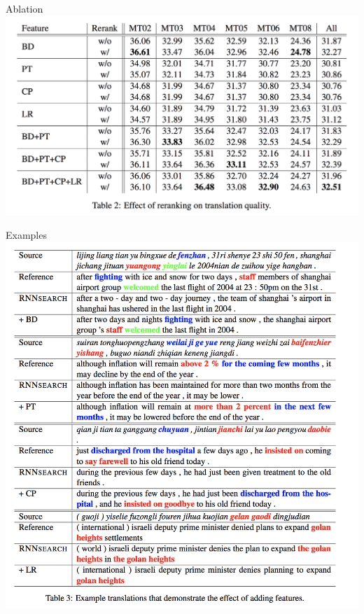 \documentclass{beamer}
\begin{document}
\begin{frame}{Ablation}{}
\centering
\includegraphics[width=\textheight]{ablation}
\end{frame}

\begin{frame}{Examples}{}
\centering
\includegraphics[height=0.8\textheight]{examples}
\end{frame}
\end{document}
